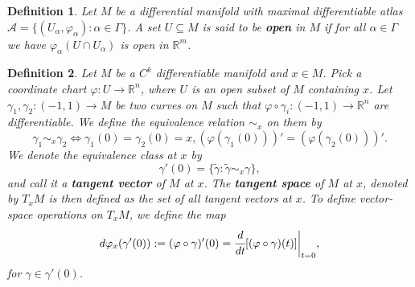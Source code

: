 \documentclass[12pt]{article}
\newcommand{\real}{\mathbb{R}}
\newcommand\set[1]{\{#1\}}
\newcommand{\res}[2]{#1\bigg\rvert_{#2}}
\newtheorem{defn}{Definition}[thm]
\begin{document}
\begin{defn}
  Let $M$ be a differential manifold with maximal differentiable atlas $ \mathcal{A} = \set{(U_{\alpha}, \varphi_{\alpha}): \alpha \in \Gamma}$. A set $U \subseteq M$ is said to be \textbf{open} in $M$ if for all $\alpha \in \Gamma$ we have $\varphi_{\alpha}(U \cap U_{\alpha})$ is open in $\real^m$.
\end{defn}
\begin{defn}
  Let $M$ be a $C^k$ differentiable manifold and $x \in M$. Pick a coordinate chart $\varphi : U \to \real^n$, where $U$ is an open subset of $M$ containing $x$. Let $\gamma_1, \gamma_2 : (-1,1) \to M$ be two curves on $M$ such that  $\varphi \circ \gamma_i: (-1,1) \to \real^n$ are differentiable. We define the equivalence relation $ \sim_x $ on them by
  \begin{equation*}
    \gamma_1 \sim_x \gamma_2 \iff \gamma_1(0) = \gamma_2(0) = x, (\varphi (\gamma_1(0)))' = (\varphi (\gamma_2 (0)))'.
  \end{equation*}
  We  denote the equivalence class at $x$ by 
  \begin{equation*}
    \gamma'(0)= \set{\widetilde{\gamma} : \widetilde{\gamma} \sim_x \gamma},
  \end{equation*}
  and  call it a \textbf{tangent vector} of $M$ at $x$. The \textbf{tangent space}  of  $M$ at $x$,  denoted by $T_xM$ is then defined as the set  of all tangent vectors  at $x$. To define vector-space operations on $T_xM$, we define the map
  \begin{equation*}
    d\varphi_x(\gamma'(0)) := (\varphi \circ \gamma)'(0) = \res{\cfrac{d}{dt}[(\varphi \circ \gamma)(t)]}{t=0},
  \end{equation*}
  for $ \gamma \in \gamma'(0)$.
\end{defn}
\end{document}
